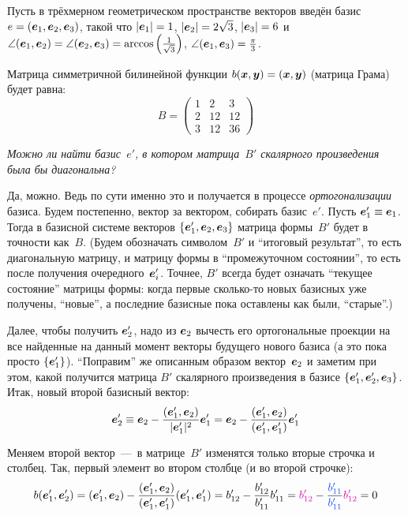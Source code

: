 \documentclass[a4paper,12pt]{article}
\begin{document}
  \begin{example}\label{ex:diag-scalar}
    Пусть в трёхмерном геометрическом пространстве векторов введён базис $e \hm= (\bds e_1, \bds e_2, \bds e_3)$, такой что $|\bds e_1| \hm= 1$, $|\bds e_2| \hm= 2 \sqrt{3}$, $|\bds e_3| \hm= 6$ и $\angle(\bds e_1, \bds e_2) \hm= \angle(\bds e_2, \bds e_3) \hm= \arccos\left(\frac{1}{\sqrt{3}}\right)$, $\angle(\bds e_1, \bds e_3) \hm= \frac{\pi}{3}$.
    
    Матрица симметричной билинейной функции $b(\bds x, \bds y) \hm= (\bds x, \bds y)$ (матрица Грама) будет равна:
    \[
      B = \begin{pmatrix}
        1 & 2  & 3\\
        2 & 12 & 12\\
        3 & 12 & 36
      \end{pmatrix}
    \]
    
    \emph{Можно ли найти базис~$e'$, в котором матрица~$B'$ скалярного произведения была бы диагональна?}
    
    Да, можно.
    Ведь по сути именно это и получается в процессе \emph{ортогонализации} базиса.
    Будем постепенно, вектор за вектором, собирать базис~$e'$.
    Пусть $\bds e_1' \hm\equiv \bds e_1$.
    Тогда в базисной системе векторов $\{\boldsymbol e_1', \boldsymbol e_2, \boldsymbol e_3\}$ матрица формы~$B'$ будет в точности как~$B$.
    (Будем обозначать символом~$B'$ и ``итоговый результат'', то есть диагональную матрицу, и матрицу формы в ``промежуточном состоянии'', то есть после получения очередного~$\boldsymbol e_i'$.
    Точнее, $B'$ всегда будет означать ``текущее состояние'' матрицы формы: когда первые сколько-то новых базисных уже получены, ``новые'', а последние базисные пока оставлены как были, ``старые''.)
    
    Далее, чтобы получить $\boldsymbol e_2'$, надо из $\boldsymbol e_2$ вычесть его ортогональные проекции на все найденные на данный момент векторы будущего нового базиса (а это пока просто $\{\boldsymbol e_1'\}$).
    ``Поправим'' же описанным образом вектор~$\boldsymbol e_2$ и заметим при этом, какой получится матрица $B'$ скалярного произведения в базисе $\{\boldsymbol e_1', \boldsymbol e_2', \boldsymbol e_3\}$.
    Итак, новый второй базисный вектор:
    \[
      \boldsymbol e_2' \equiv \boldsymbol e_2 - \frac{(\boldsymbol e_1', \boldsymbol e_2)}{|\boldsymbol e_1'|^2} \boldsymbol e_1'
                     = \boldsymbol e_2 - \frac{(\boldsymbol e_1', \boldsymbol e_2)}{(\boldsymbol e_1', \boldsymbol e_1')} \boldsymbol e_1'
    \]
    
    Меняем второй вектор~---~в матрице~$B'$ изменятся только вторые строчка и столбец.
    Так, первый элемент во втором столбце (и во второй строчке):
    \[
      b(\bds e_1', \bds e_2') = (\bds e_1', \bds e_2) - \frac{(\bds e_1', \bds e_2)}{(\bds e_1', \bds e_1')} (\bds e_1', \bds e_1')
        = b'_{12} - \frac{b'_{12}}{b'_{11}} b'_{11}
        = \textcolor{pink}{b'_{12}} - \frac{\textcolor{blue}{b'_{11}}}{\textcolor{blue}{b'_{11}}} \textcolor{pink}{b'_{12}}
        = 0
    \]
        

\end{example}
\end{document}
